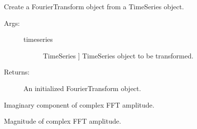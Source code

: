 \documentclass[letterpaper,10pt,english,openany,oneside]{sphinxmanual}
\begin{document}
\begin{fulllineitems}
\begin{fulllineitems}
\begin{description}
\begin{description}
\begin{description}
\end{description}

\end{description}

\end{description}

\end{fulllineitems}


\begin{fulllineitems}
\label{\detokenize{index:sigpropy.FourierTransform.from_timeseries}}
Create a FourierTransform object from a TimeSeries object.
\begin{description}
\item[{Args:}] \leavevmode\begin{description}
\item[{timeseries}] \leavevmode{[}TimeSeries {]}
TimeSeries object to be transformed.

\end{description}

\item[{Returns:}] \leavevmode
An initialized FourierTransform object.

\end{description}

\end{fulllineitems}


\begin{fulllineitems}
\label{\detokenize{index:sigpropy.FourierTransform.imag}}
Imaginary component of complex FFT amplitude.

\end{fulllineitems}


\begin{fulllineitems}
\label{\detokenize{index:sigpropy.FourierTransform.mag}}
Magnitude of complex FFT amplitude.


\end{fulllineitems}
\end{fulllineitems}
\end{document}
